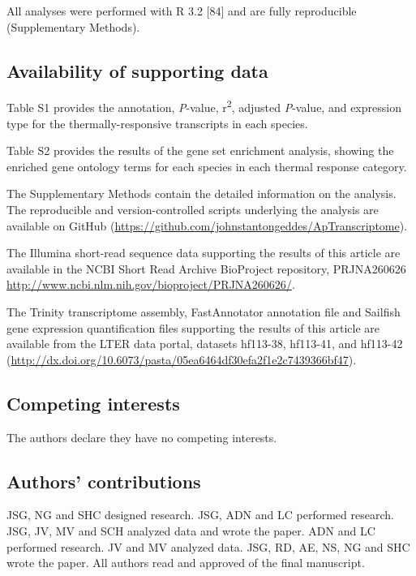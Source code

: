 \documentclass[]{article}
\begin{document}
All analyses were performed with R 3.2 {[}84{]} and are fully
reproducible (Supplementary Methods).

\subsection{Availability of supporting
data}\label{availability-of-supporting-data}

Table S1 provides the annotation, \emph{P}-value, r\textsuperscript{2},
adjusted \emph{P}-value, and expression type for the
thermally-responsive transcripts in each species.

Table S2 provides the results of the gene set enrichment analysis,
showing the enriched gene ontology terms for each species in each
thermal response category.

The Supplementary Methods contain the detailed information on the
analysis. The reproducible and version-controlled scripts underlying the
analysis are available on GitHub
(\url{https://github.com/johnstantongeddes/ApTranscriptome}).

The Illumina short-read sequence data supporting the results of this
article are available in the NCBI Short Read Archive BioProject
repository, PRJNA260626
\url{http://www.ncbi.nlm.nih.gov/bioproject/PRJNA260626/}.

The Trinity transcriptome assembly, FastAnnotator annotation file and
Sailfish gene expression quantification files supporting the results of
this article are available from the LTER data portal, datasets hf113-38,
hf113-41, and hf113-42
(\url{http://dx.doi.org/10.6073/pasta/05ea6464df30efa2f1e2c7439366bf47}).

\subsection{Competing interests}\label{competing-interests}

The authors declare they have no competing interests.

\subsection{Authors' contributions}\label{authors-contributions}

JSG, NG and SHC designed research. JSG, ADN and LC performed research.
JSG, JV, MV and SCH analyzed data and wrote the paper. ADN and LC
performed research. JV and MV analyzed data. JSG, RD, AE, NS, NG and SHC
wrote the paper. All authors read and approved of the final manuscript.
\end{document}
